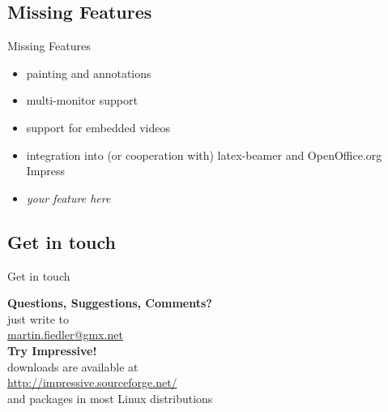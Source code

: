 \documentclass[bigger,hyperref={colorlinks=true,linkcolor=white,urlcolor=blue}]{beamer}
\begin{document}
\subsection{Missing Features}
\begin{frame}{Missing Features}
    \begin{itemize}
        \item painting and annotations
        \item multi-monitor support
        \item support for embedded videos
        \item integration into (or cooperation with) latex-beamer
              and OpenOffice.org Impress
        \item \alert{\emph{your feature here}}
    \end{itemize}
\end{frame}

\subsection{Get in touch}
\begin{frame}{Get in touch}
\begin{center}
    \textbf{Questions, Suggestions, Comments?} \\
    just write to \\
    \href{mailto:martin.fiedler@gmx.net}{martin.fiedler@gmx.net}
    \vspace{1.5cm} \\
    \textbf{Try Impressive!} \\
    downloads are available at \\
    \href{http://impressive.sourceforge.net/}{http://impressive.sourceforge.net/} \\
    and packages in most Linux distributions
\end{center}
\end{frame}
\end{document}
